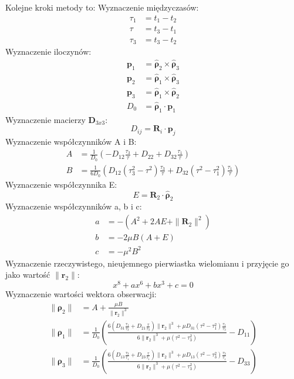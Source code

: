 Kolejne kroki metody to: \newline
Wyznaczenie międzyczasów:
\begin{align}
\tau_1 &= t_1 - t_2 \\
\tau &= t_3 - t_1 \\
\tau_3 &= t_3 - t_2 
\end{align}
Wyznaczenie iloczynów: 
\begin{align}
\mathbf{p}_1 &= \mathbf{\hat{\boldsymbol\rho}}_2 \times  \mathbf{\hat{\boldsymbol\rho}}_3 \\
\mathbf{p}_2 &= \mathbf{\hat{\boldsymbol\rho}}_1 \times  \mathbf{\hat{\boldsymbol\rho}}_3\\
\mathbf{p}_3 &= \mathbf{\hat{\boldsymbol\rho}}_1 \times  \mathbf{\hat{\boldsymbol\rho}}_2\\
D_0 &= \hat{\boldsymbol\rho}_1 \cdot \mathbf{p}_1
\end{align}
Wyznaczenie macierzy $\boldsymbol{D}_{3x3}$:
\begin{equation}
D_{ij} = \boldsymbol R_i \cdot \boldsymbol p_j
\end{equation}
Wyznaczenie współczynników A i B:
\begin{align}
A &= \frac{1}{D_0} \left(-D_{12}\frac{\tau_3}{\tau}+D_{22}+D_{32}\frac{\tau_1}{\tau}\right) \\
B &= \frac{1}{6D_0} \left(D_{12}(\tau_3^2-\tau^2)\frac{\tau_3}{\tau}+D_{32}(\tau^2-\tau^2_1)\frac{\tau_1}{\tau}\right)
\end{align}
Wyznaczenie współczynnika E: 
\begin{equation}
E = \mathbf{R}_2 \cdot \boldsymbol{\hat{\rho}}_2
\end{equation}
Wyznaczenie współczynników a, b i c:
\begin{align}
a &= -(A^2+2AE+\|\mathbf{R}_2\|^2)\\
b &= -2\mu B(A+E)\\
c &=  -\mu^2B^2 
\end{align}
Wyznaczenie rzeczywistego, nieujemnego pierwiastka wielomianu i przyjęcie go jako wartość $\|\boldsymbol{r}_2\|$:
\begin{equation}
x^8 + ax^6 + bx^3 + c = 0
\end{equation}
Wyznaczenie wartości wektora obserwacji:
\begin{align}
\|\boldsymbol\rho_2\| &= A + \frac{\mu B}{\|\mathbf{r}_2\|^3} \\
\|\boldsymbol\rho_1\| &= \frac{1}{D_0} \left(\frac{6\left(D_{31}\frac{\tau_1}{\tau_3}+D_{21}\frac{\tau}{\tau_3}\right)\|\mathbf{r}_2\|^3 + \mu D_{31} (\tau^2-\tau_1^2)\frac{\tau_1}{\tau_3}}
{6\|\mathbf{r}_2\|^3+\mu(\tau^2-\tau^2_3)}   -D_{11} \right) \\
\|\boldsymbol\rho_3\| &= \frac{1}{D_0} \left(\frac{6\left(D_{13}\frac{\tau_3}{\tau_1}+D_{23}\frac{\tau}{\tau_1}\right)\|\mathbf{r}_2\|^3 + \mu D_{13} (\tau^2-\tau_3^2)\frac{\tau_3}{\tau_1}}
{6\|\mathbf{r}_2\|^3+\mu(\tau^2-\tau^2_3)}  -D_{33}  \right) \\
\end{align}
